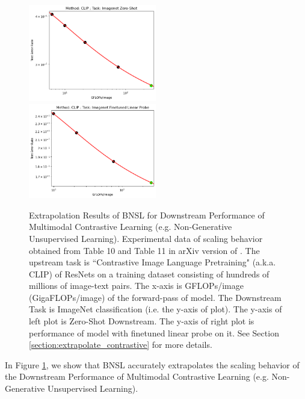 \documentclass{article} %
\begin{document}
\begin{figure}[htbp]
    \centering
\includegraphics[width=0.497\textwidth]{figures/clip/CLIP__Resnet__Imagenet_Zero-Shot.png}
\includegraphics[width=0.497\textwidth]{figures/clip/CLIP__Resnet__Imagenet_Finetune_Linear_Probe.png}

    \caption{
    Extrapolation Results of BNSL for Downstream Performance of Multimodal Contrastive Learning (e.g. Non-Generative Unsupervised Learning). Experimental data of scaling behavior obtained from Table 10 and Table 11 in arXiv version of \cite{radford2021learning}. The upstream task is ``Contrastive Image Language Pretraining" (a.k.a. CLIP) of ResNets on a training dataset consisting of hundreds of millions of image-text pairs. The x-axis is GFLOPs/image (GigaFLOPs/image) of the forward-pass of model. The Downstream Task is ImageNet classification (i.e. the y-axis of plot). The y-axis of left plot is Zero-Shot Downstream. The y-axis of right plot is performance of model with finetuned linear probe on it. See Section \ref{section:extrapolate_contrastive} for more details.
    }
    \label{fig:extrapolate_contrastive}
\end{figure}

In Figure \ref{fig:extrapolate_contrastive}, we show that BNSL accurately extrapolates the scaling behavior of the Downstream Performance of Multimodal Contrastive Learning (e.g. Non-Generative Unsupervised Learning).
\end{document}
